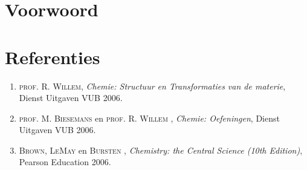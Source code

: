 \section*{Voorwoord}

\section*{Referenties}
\begin{enumerate}
	\item \textsc{prof. R. Willem}, \textit{Chemie: Structuur en Transformaties van de materie}, Dienst Uitgaven VUB 2006.\par
  \item \textsc{prof. M. Biesemans} en \textsc{prof. R. Willem} , \textit{Chemie: Oefeningen}, Dienst Uitgaven VUB 2006.\par
  \item \textsc{Brown, LeMay} en \textsc{Bursten} , \textit{Chemistry: the Central Science (10th Edition)}, Pearson Education 2006.
\end{enumerate}
